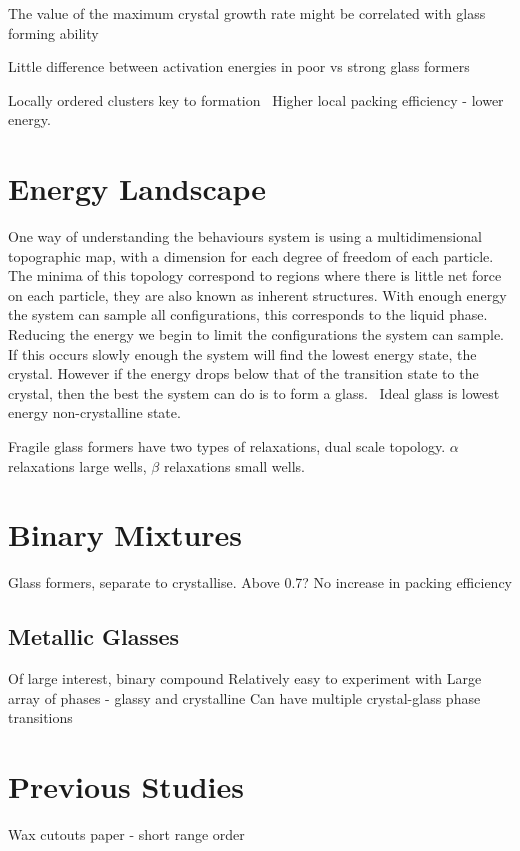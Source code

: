 The value of the maximum crystal growth rate might be correlated with glass forming ability~\cite{tang:13}

Little difference between activation energies in poor vs strong glass formers~\cite{tang:13}

Locally ordered clusters key to formation~\cite{yang:12} Higher local packing efficiency - lower energy. 

\section{Energy Landscape}
One way of understanding the behaviours system is using a multidimensional topographic map, with a dimension for each degree of freedom of each particle. The minima of this topology correspond to regions where there is little net force on each particle, they are also known as inherent structures. With enough energy the system can sample all configurations, this corresponds to the liquid phase. Reducing the energy we begin to limit the configurations the system can sample. If this occurs slowly enough the system will find the lowest energy state, the crystal. However if the energy drops below that of the transition state to the crystal, then the best the system can do is to form a glass.~\cite{stillinger:95} Ideal glass is lowest energy non-crystalline state.

\begin{figure}
\end{figure}

Fragile glass formers have two types of relaxations, dual scale topology. $\alpha$ relaxations large wells, $\beta$ relaxations small wells.~\cite{stillinger:95}

\section{Binary Mixtures}
Glass formers, separate to crystallise. Above 0.7? No increase in packing efficiency

\subsection{Metallic Glasses}
Of large interest, binary compound
Relatively easy to experiment with
Large array of phases - glassy and crystalline
Can have multiple crystal-glass phase transitions



\section{Previous Studies}
Wax cutouts paper - short range order

